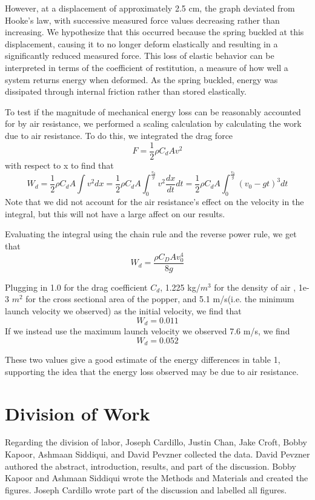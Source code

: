 \documentclass{article}
\begin{document}
However, at a displacement of approximately 2.5 cm, the graph deviated from Hooke’s law, with successive measured force values decreasing rather than increasing. We hypothesize that this occurred because the spring buckled at this displacement, causing it to no longer deform elastically and resulting in a significantly reduced measured force. This loss of elastic behavior can be interpreted in terms of the coefficient of restitution, a measure of how well a system returns energy when deformed. As the spring buckled, energy was dissipated through internal friction rather than stored elastically. 

To test if the magnitude of mechanical energy loss can be reasonably accounted for by air resistance, we performed a scaling calculation by calculating the work due to air resistance. To do this, we integrated the drag force
\begin{equation}
    F = \frac{1}{2}\rho C_d Av^2
\end{equation}
with respect to x to find that 
\begin{equation}
    W_d = \frac{1}{2}\rho C_d A\int v^2 dx = \frac{1}{2}\rho C_d A\int_0^{\frac{v_0}{g}} v^2 \frac{dx}{dt} dt = \frac{1}{2}\rho C_d A\int_0^{\frac{v_0}{g}} (v_0-gt)^3 dt
\end{equation}
Note that we did not account for the air resistance's effect on the velocity in the integral, but this will not have a large affect on our results. 

Evaluating the integral using the chain rule and the reverse power rule, we get that
\begin{equation}
    W_d = \frac{\rho C_DAv_0^4}{8g}
\end{equation}

Plugging in 1.0 for the drag coefficient $C_d$, 1.225 kg/$m^3$ for the density of air \cite{phys}, 1e-3 $m^2$ for the cross sectional area of the popper, and 5.1 m/s(i.e. the minimum launch velocity we observed) as the initial velocity, we find that
\begin{equation}
    W_d = 0.011
\end{equation}
If we instead use the maximum launch velocity we observed 7.6 m/s, we find
\begin{equation}
    W_d = 0.052
\end{equation}

These two values give a good estimate of the energy differences in table 1, supporting the idea that the energy loss observed may be due to air resistance. 

\section{Division of Work}

Regarding the division of labor, Joseph Cardillo, Justin Chan, Jake Croft, Bobby Kapoor, Ashmaan Siddiqui, and David Pevzner collected the data. David Pevzner authored the abstract, introduction, results, and part of the discussion. Bobby Kapoor and Ashmaan Siddiqui wrote the Methods and Materials and created the figures. Joseph Cardillo wrote part of the discussion and labelled all figures. 



\nocite{*}
\end{document}
